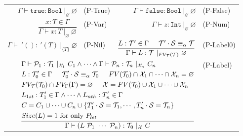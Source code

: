 \documentclass{article}
\begin{document}
\begin{figure}[tb]
    \centering
    \begin{tabular}{rlrl}
        $\Gamma \vdash \mathtt{true} : \mathtt{Bool}\ |_\varnothing\ \varnothing$ & (P-True) &
        $\Gamma \vdash \mathtt{false} : \mathtt{Bool}\ |_\varnothing\ \varnothing$ & (P-False) \vspace{5mm} \\

        $\dfrac{x : T \in \Gamma}{\Gamma \vdash x : T\ |_\varnothing\ \varnothing}$ & (P-Var) &
        $\Gamma \vdash z : \mathtt{Int}\ |_\varnothing\ \varnothing$ & (P-Num) \vspace{5mm} \\

        $\Gamma \vdash\ '() :\ '(T)\ |_{\{T\}}\ \varnothing$ & (P-Nil) &
        $\dfrac{L : \mathcal{T}' \in \Gamma \hspace{5mm} \mathcal{T}' \cdot \mathcal{S} \equiv_\alpha \mathcal{T}}{\Gamma \vdash L : \mathcal{T}\ |_{FV_\mathcal{T}(\mathcal{T})}\ \varnothing}$ & (P-Label0) \vspace{5mm} \\

        \multicolumn{3}{r}{
        $\dfrac{
            \begin{aligned}
                &\Gamma \vdash \mathcal{P}_1 : \mathcal{T}_1\ |_{\mathcal{X}_1}\ C_1 \land \cdots \land
                    \Gamma \vdash \mathcal{P}_n : \mathcal{T}_n\ |_{\mathcal{X}_n}\ C_n \\
                &L : \mathcal{T}_0' \in \Gamma \hspace{5mm} \mathcal{T}_0' \cdot \mathcal{S}\equiv_\alpha \mathcal{T}_0 \hspace{5mm} FV(\mathcal{T}_0) \cap \mathcal{X}_1 \cap \cdots \cap \mathcal{X}_n = \varnothing \\
                &FV_\mathcal{T}(\mathcal{T}_0) \cap FV_\Gamma(\Gamma) = \varnothing \hspace{5mm}
                    \mathcal{X} = FV(\mathcal{T}_0) \cup \mathcal{X}_1 \cup \cdots \cup \mathcal{X}_n \\
                &L_{1st} : T_1' \in \Gamma \land \cdots \land L_{nth} : T_n' \in \Gamma \\
                &C = C_1 \cup \cdots \cup C_n \cup \{T_1' \cdot \mathcal{S} = \mathcal{T}_1, \cdots, T_n' \cdot \mathcal{S} = \mathcal{T}_n\} \\
                &Size(L) = 1\ \mbox{for only}\ P_{let}
            \end{aligned}
        }{
            \Gamma \vdash (L\ \mathcal{P}_1\ \cdots\ \mathcal{P}_n) : \mathcal{T}_0\ |_{\mathcal{X}}\ C
        }$} & (P-Label) \vspace{5mm} \\


\end{tabular}
\end{figure}
\end{document}
